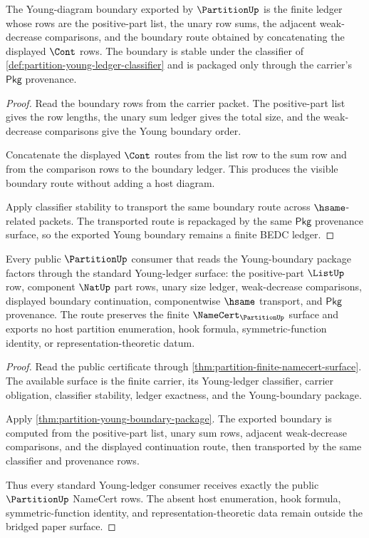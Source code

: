 \begin{theorem}
\label{thm:partition-young-boundary-package}
The Young-diagram boundary exported by $\PartitionUp$ is the finite ledger
whose rows are the positive-part list, the unary row sums, the adjacent
weak-decrease comparisons, and the boundary route obtained by concatenating
the displayed $\Cont$ rows. The boundary is stable under the classifier of
\autoref{def:partition-young-ledger-classifier} and is packaged only through
the carrier's $\mathsf{Pkg}$ provenance.
\end{theorem}
\begin{proof}
Read the boundary rows from the carrier packet. The positive-part list gives
the row lengths, the unary sum ledger gives the total size, and the
weak-decrease comparisons give the Young boundary order.

Concatenate the displayed $\Cont$ routes from the list row to the sum row and
from the comparison rows to the boundary ledger. This produces the visible
boundary route without adding a host diagram.

Apply classifier stability to transport the same boundary route across
$\hsame$-related packets. The transported route is repackaged by the same
$\mathsf{Pkg}$ provenance surface, so the exported Young boundary remains a
finite BEDC ledger.
\end{proof}

\begin{theorem}
\label{thm:partition-bridged-closure-route}
Every public $\PartitionUp$ consumer that reads the Young-boundary package
factors through the standard Young-ledger surface: the positive-part
$\ListUp$ row, component $\NatUp$ part rows, unary size ledger,
weak-decrease comparisons, displayed boundary continuation, componentwise
$\hsame$ transport, and $\mathsf{Pkg}$ provenance. The route preserves the
finite $\NameCert_{\PartitionUp}$ surface and exports no host partition
enumeration, hook formula, symmetric-function identity, or
representation-theoretic datum.
\end{theorem}
\begin{proof}
Read the public certificate through
\autoref{thm:partition-finite-namecert-surface}. The available surface is the
finite carrier, its Young-ledger classifier, carrier obligation, classifier
stability, ledger exactness, and the Young-boundary package.

Apply \autoref{thm:partition-young-boundary-package}. The exported boundary is
computed from the positive-part list, unary sum rows, adjacent weak-decrease
comparisons, and the displayed continuation route, then transported by the
same classifier and provenance rows.

Thus every standard Young-ledger consumer receives exactly the public
$\PartitionUp$ NameCert rows. The absent host enumeration, hook formula,
symmetric-function identity, and representation-theoretic data remain outside
the bridged paper surface.
\end{proof}

